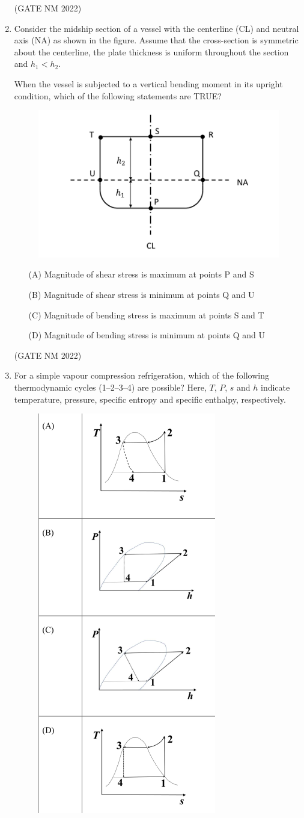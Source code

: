 \documentclass[journal,12pt,onecolumn]{IEEEtran}
\theoremstyle{remark}
\begin{document}
\begin{enumerate}
\hfill(GATE NM 2022)









\item  Consider the midship section of a vessel with the centerline (CL) and neutral axis (NA) as shown in the figure.  
Assume that the cross-section is symmetric about the centerline, the plate thickness is uniform throughout the section and $h_1 < h_2$.  

When the vessel is subjected to a vertical bending moment in its upright condition, which of the following statements are TRUE?

\begin{figure}[h]
	\centering
	\includegraphics[width=0.3\columnwidth]{fig7}
	\caption{}
	\label{fig:placeholder}
\end{figure}

\begin{enumerate}
    \item[(A)] Magnitude of shear stress is maximum at points P and S
    \item[(B)] Magnitude of shear stress is minimum at points Q and U
    \item[(C)] Magnitude of
	    bending stress is maximum at points S and T
    \item[(D)] Magnitude of bending stress is minimum at points Q and U
\end{enumerate}

\hfill(GATE NM 2022)


\item  For a simple vapour compression refrigeration, which of the following thermodynamic cycles (1--2--3--4) are possible?  
Here, $T$, $P$, $s$ and $h$ indicate temperature, pressure, specific entropy and specific enthalpy, respectively.

\begin{figure}[h]
\centering
\includegraphics[width=0.2\columnwidth]{fig8}
\caption{}
\label{fig:placeholder}
\end{figure}


\end{enumerate}
\end{document}
